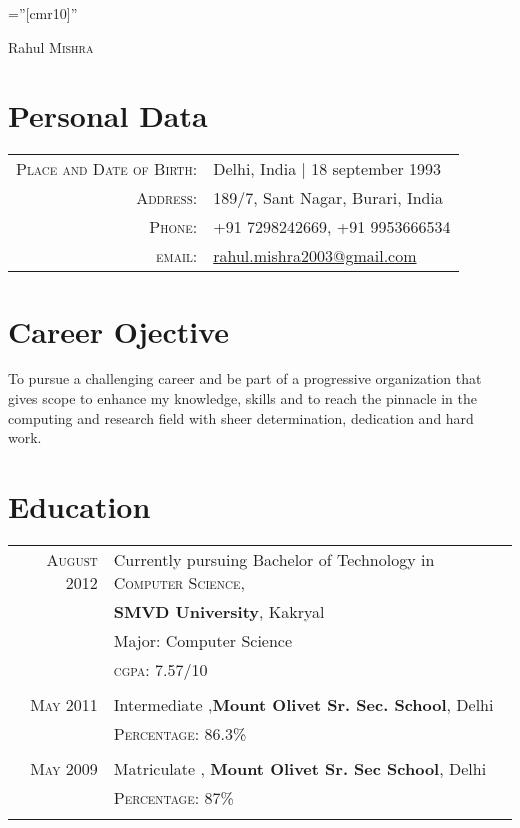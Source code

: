 \documentclass[a4paper,10pt]{article}
\begin{document}
\pagestyle{empty} %

\font\fb=''[cmr10]'' %

\par{\centering
		{\Huge Rahul \textsc{Mishra}
	}\bigskip\par}

\section{Personal Data}

\begin{tabular}{rl}
    \textsc{Place and Date of Birth:} & Delhi, India  | 18 september 1993 \\
    \textsc{Address:}   & 189/7, Sant Nagar, Burari, India \\
    \textsc{Phone:}     & +91 7298242669, +91 9953666534\\
    \textsc{email:}     & \href{mailto:rahul.mishra2003@gmail.com}{rahul.mishra2003@gmail.com}
\end{tabular}

\section{Career Ojective}
\begin{flushleft}
To pursue a challenging career and be part of a progressive organization that gives scope to enhance my knowledge, skills and to reach the pinnacle in the computing and research field with sheer determination, dedication and hard work.
\end{flushleft}

\section{Education}
\begin{tabular}{rl}	
 \textsc{August} 2012 & Currently pursuing Bachelor of Technology in \textsc{Computer Science, }\\& \textbf{SMVD University}, Kakryal\\
& Major: Computer Science\\
&\normalsize \textsc{cgpa}: 7.57/10 \\ & \\
\textsc{May} 2011& Intermediate  ,\normalsize\textbf{Mount Olivet Sr. Sec. School}, Delhi\\
&\normalsize \textsc{Percentage}: 86.3\% \\&\\
\textsc{May} 2009& Matriculate , \textbf{Mount Olivet Sr. Sec School}, Delhi\\
&\textsc{Percentage}: 87\% \\&\\
\end{tabular}
\end{document}
